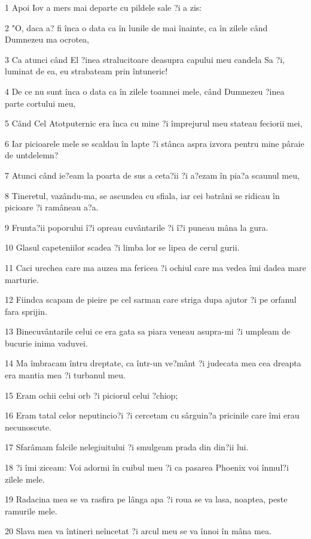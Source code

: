 \par 1 Apoi Iov a mers mai departe cu pildele sale ?i a zis:
\par 2 "O, daca a? fi înca o data ca în lunile de mai înainte, ca în zilele când Dumnezeu ma ocrotea,
\par 3 Ca atunci când El ?inea stralucitoare deasupra capului meu candela Sa ?i, luminat de ea, eu strabateam prin întuneric!
\par 4 De ce nu sunt înca o data ca în zilele toamnei mele, când Dumnezeu ?inea parte cortului meu,
\par 5 Când Cel Atotputernic era înca cu mine ?i împrejurul meu stateau feciorii mei,
\par 6 Iar picioarele mele se scaldau în lapte ?i stânca aspra izvora pentru mine pâraie de untdelemn?
\par 7 Atunci când ie?eam la poarta de sus a ceta?ii ?i a?ezam în pia?a scaunul meu,
\par 8 Tineretul, vazându-ma, se ascundea cu sfiala, iar cei batrâni se ridicau în picioare ?i ramâneau a?a.
\par 9 Frunta?ii poporului î?i opreau cuvântarile ?i î?i puneau mâna la gura.
\par 10 Glasul capeteniilor scadea ?i limba lor se lipea de cerul gurii.
\par 11 Caci urechea care ma auzea ma fericea ?i ochiul care ma vedea îmi dadea mare marturie.
\par 12 Fiindca scapam de pieire pe cel sarman care striga dupa ajutor ?i pe orfanul fara sprijin.
\par 13 Binecuvântarile celui ce era gata sa piara veneau asupra-mi ?i umpleam de bucurie inima vaduvei.
\par 14 Ma îmbracam întru dreptate, ca într-un ve?mânt ?i judecata mea cea dreapta era mantia mea ?i turbanul meu.
\par 15 Eram ochii celui orb ?i piciorul celui ?chiop;
\par 16 Eram tatal celor neputincio?i ?i cercetam cu sârguin?a pricinile care îmi erau necunoscute.
\par 17 Sfarâmam falcile nelegiuitului ?i smulgeam prada din din?ii lui.
\par 18 ?i îmi ziceam: Voi adormi în cuibul meu ?i ca pasarea Phoenix voi înmul?i zilele mele.
\par 19 Radacina mea se va rasfira pe lânga apa ?i roua se va lasa, noaptea, peste ramurile mele.
\par 20 Slava mea va întineri neîncetat ?i arcul meu se va înnoi în mâna mea.
